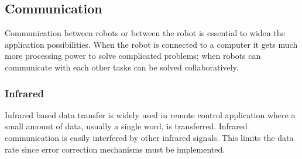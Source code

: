 \documentclass[11pt,a4paper]{article}
\begin{document}
\subsection{Communication}
Communication between robots or between the robot is essential to widen the application possibilities. When the robot is connected to a computer it gets much more processing power to solve complicated problems; when robots can communicate with each other tasks can be solved collaboratively.

\subsubsection{Infrared}
Infrared based data transfer is widely used in remote control application where a small amount of data, usually a single word, is transferred. Infrared communication is easily interfered by other infrared signals. This limits the data rate since error correction mechanisms must be implemented.
\end{document}
